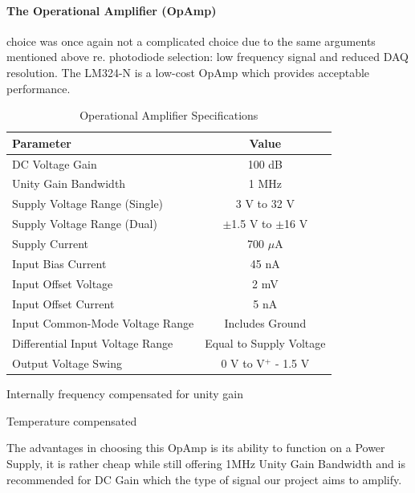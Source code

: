 \paragraph{The Operational Amplifier (OpAmp)} choice was once again not a complicated choice due to the same arguments mentioned above re. photodiode selection: low frequency signal and reduced DAQ resolution. The LM324-N is a low-cost OpAmp which provides acceptable performance. 
%
%
\begin{table}[htbp]
  \centering
  \caption{Operational Amplifier Specifications}
  \begin{tabular}{|l|c|}
  \hline
  \textbf{Parameter} & \textbf{Value} \\
  \hline
  DC Voltage Gain & 100 dB \\
  \hline
  Unity Gain Bandwidth & 1 MHz \\
  \hline
  Supply Voltage Range (Single) & 3 V to 32 V \\
  \hline
  Supply Voltage Range (Dual) & $\pm$1.5 V to $\pm$16 V \\
  \hline
  Supply Current & 700 $\mu$A \\
  \hline
  Input Bias Current & 45 nA \\
  \hline
  Input Offset Voltage & 2 mV \\
  \hline
  Input Offset Current & 5 nA \\
  \hline
  Input Common-Mode Voltage Range & Includes Ground \\
  \hline
  Differential Input Voltage Range & Equal to Supply Voltage \\
  \hline
  Output Voltage Swing & 0 V to V$^{+}$ - 1.5 V \\
  \hline
  \end{tabular}
  \begin{tablenotes}
  \small
  \item Internally frequency compensated for unity gain
  \item Temperature compensated
  \end{tablenotes}
\end{table}
The advantages in choosing this OpAmp is its ability to function on a Power Supply, it is rather cheap while still offering 1MHz Unity Gain Bandwidth and is recommended for DC Gain which the type of signal our project aims to amplify.


